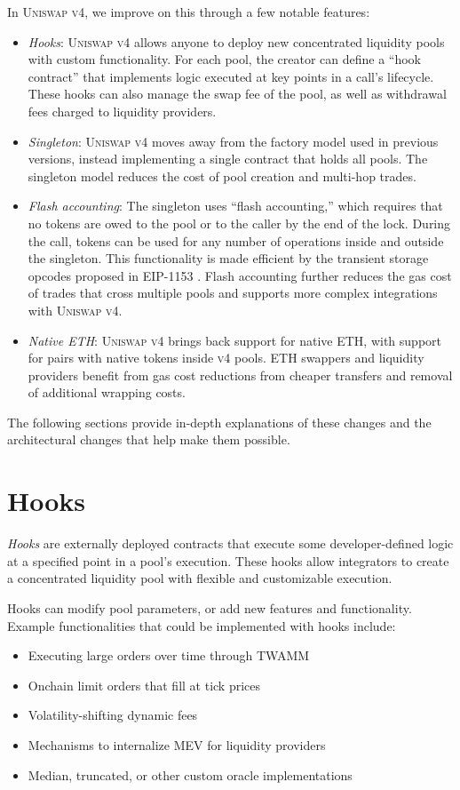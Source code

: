 \documentclass[sigconf,nonacm,prologue,table]{acmart}
\numberwithin{equation}{section}
\theoremstyle{definition}
\theoremstyle{remark}
\begin{document}
In \textsc{Uniswap v4}, we improve on this through a few notable features:
\begin{itemize}
    \item \emph{Hooks}: \textsc{Uniswap v4} allows anyone to deploy new concentrated liquidity pools with custom functionality. For each pool, the creator can define a “hook contract” that implements logic executed at key points in a call’s lifecycle. These hooks can also manage the swap fee of the pool, as well as withdrawal fees charged to liquidity providers.
    \item \emph{Singleton}: \textsc{Uniswap v4} moves away from the factory model used in previous versions, instead implementing a single contract that holds all pools. The singleton model reduces the cost of pool creation and multi-hop trades.
    \item \emph{Flash accounting}:  The singleton uses “flash accounting,” which requires that no tokens are owed to the pool or to the caller by the end of the lock. During the call, tokens can be used for any number of operations inside and outside the singleton. This functionality is made efficient by the transient storage opcodes proposed in EIP-1153 \cite{Akhunov2018}. Flash accounting further reduces the gas cost of trades that cross multiple pools and supports more complex integrations with \textsc{Uniswap v4}.
    \item \emph{Native ETH}: \textsc{Uniswap v4} brings back support for native ETH, with support for pairs with native tokens inside \textsc{v4} pools. ETH swappers and liquidity providers benefit from gas cost reductions from cheaper transfers and removal of additional wrapping costs.
\end{itemize}

The following sections provide in-depth explanations of these changes and the architectural changes that help make them possible.

\section{Hooks} 
\label{sec:Hooks}

\emph{Hooks} are externally deployed contracts that execute some developer-defined logic at a specified point in a pool’s execution. These hooks allow integrators to create a concentrated liquidity pool with flexible and customizable execution.

Hooks can modify pool parameters, or add new features and functionality. Example functionalities that could be implemented with hooks include: 
\begin{itemize}
\item Executing large orders over time through TWAMM 
\item Onchain limit orders that fill at tick prices
\item Volatility-shifting dynamic fees
\item Mechanisms to internalize MEV for liquidity providers
\item Median, truncated, or other custom oracle implementations
\end{itemize}
\end{document}
